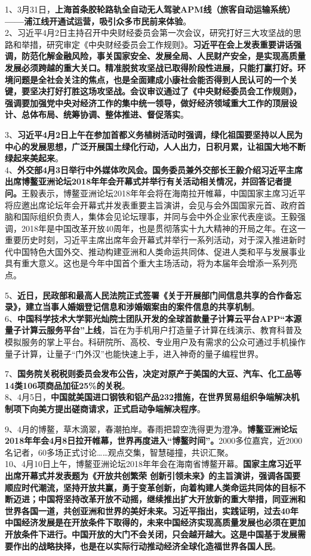 1、3月31日，{\textbf{上海首条胶轮路轨全自动无人驾驶APM线（旅客自动运输系统）------浦江线开通试运营，吸引众多市民前来体验}}。\\
2、习近平4月2日主持召开中央财经委员会第一次会议，研究打好三大攻坚战的思路和举措，研究审定《中央财经委员会工作规则》。{\textbf{习近平在会上发表重要讲话强调，防范化解金融风险，事关国家安全、发展全局、人民财产安全，是实现高质量发展必须跨越的重大关口。精准脱贫攻坚战已取得阶段性进展，只能打赢打好。环境问题是全社会关注的焦点，也是全面建成小康社会能否得到人民认可的一个关键，要坚决打好打胜这场攻坚战。会议审议通过了《中央财经委员会工作规则》，强调要加强党中央对经济工作的集中统一领导，做好经济领域重大工作的顶层设计、总体布局、统筹协调、整体推进、督促落实}}。

3、{\textbf{习近平4月2日上午在参加首都义务植树活动时强调，绿化祖国要坚持以人民为中心的发展思想，广泛开展国土绿化行动，人人出力，日积月累，让祖国大地不断绿起来美起来}}。\\
4、{\textbf{外交部4月3日举行中外媒体吹风会。国务委员兼外交部长王毅介绍习近平主席出席博鳌亚洲论坛2018年年会开幕式并举行有关活动相关情况，并回答记者提问。}}王毅表示，博鳌亚洲论坛2018年年会将在海南拉开帷幕，中国国家主席习近平将应邀出席论坛年会开幕式并发表重要主旨演讲，会见与会外国国家元首、政府首脑和国际组织负责人，集体会见论坛理事，并同与会中外企业家代表座谈。王毅强调，2018年是中国改革开放40周年，也是贯彻落实十九大精神的开局之年。在这一重要历史时刻，习近平主席出席年会开幕式并举行一系列活动，对于深入推进新时代中国特色大国外交、推动构建亚洲和人类命运共同体、促进人类和平与发展事业具有重大意义。这也是今年中国首个重大主场活动，将为本届年会增添一系列亮点。

5、{\textbf{近日，民政部和最高人民法院正式签署《关于开展部门间信息共享的合作备忘录》，建立当事人婚姻登记信息和涉婚姻案由的案件信息的共享机制}}。\\
6、{\textbf{中国科学技术大学郭光灿院士团队开发的全球首款量子计算云平台APP``本源量子计算云服务平台''上线}}，旨在为手机用户打造量子计算在线演示、教育科普及模拟服务的掌上平台。科研院所、高校、专业用户及有需求的公众可通过手机操作量子计算，让量子``门外汉''也能快速上手，进入神奇的量子编程世界。

7、{\textbf{国务院关税税则委员会发布公告，决定对原产于美国的大豆、汽车、化工品等14类106项商品加征25\%的关税}}。\\
8、4月5日，{\textbf{中国就美国进口钢铁和铝产品232措施，在世界贸易组织争端解决机制项下向美方提出磋商请求，正式启动争端解决程序}}。

9、4月的博鳌，草木滴翠，春潮拍岸。春雨把碧空洗得更为澄净。{\textbf{博鳌亚洲论坛2018年年会4月8日拉开帷幕，世界再度进入``博鳌时间''。}}2000多位嘉宾，近2000名记者，60多场正式讨论\ldots{}\ldots{}观点交集，智慧碰撞，共识汇聚。\\
10、4月10日上午，博鳌亚洲论坛2018年年会在海南省博鳌开幕。{\textbf{国家主席习近平出席开幕式并发表题为《开放共创繁荣
创新引领未来》的主旨演讲，强调各国要顺应时代潮流，坚持开放共赢，勇于变革创新，向着构建人类命运共同体的目标不断迈进；中国将坚持改革开放不动摇，继续推出扩大开放新的重大举措，同亚洲和世界各国一道，共创亚洲和世界的美好未来。习近平指出，实践证明，过去40年中国经济发展是在开放条件下取得的，未来中国经济实现高质量发展也必须在更加开放条件下进行。中国开放的大门不会关闭，只会越开越大。这是中国基于发展需要作出的战略抉择，也是在以实际行动推动经济全球化造福世界各国人民}}。

